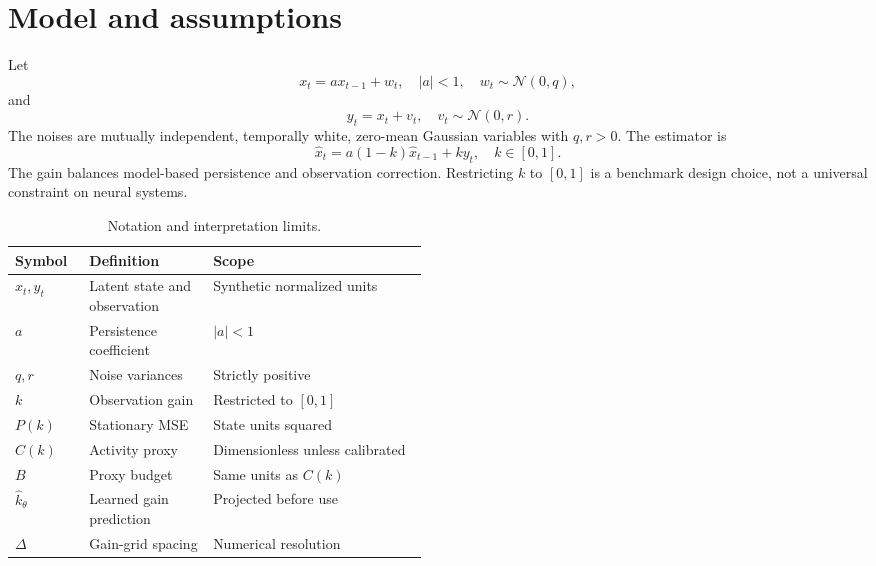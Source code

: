 \documentclass[10pt,a4paper]{article}
\begin{document}
\section{Model and assumptions}
Let
\begin{equation}
x_t=ax_{t-1}+w_t,\quad |a|<1,\quad w_t\sim\mathcal{N}(0,q),
\label{eq:state}
\end{equation}
and
\begin{equation}
y_t=x_t+v_t,\quad v_t\sim\mathcal{N}(0,r).
\label{eq:obs}
\end{equation}
The noises are mutually independent, temporally white, zero-mean Gaussian variables with $q,r>0$. The estimator is
\begin{equation}
\widehat{x}_t=a(1-k)\widehat{x}_{t-1}+ky_t,\quad k\in[0,1].
\label{eq:est}
\end{equation}
The gain balances model-based persistence and observation correction. Restricting $k$ to $[0,1]$ is a benchmark design choice, not a universal constraint on neural systems.

\begin{table}[htbp]\centering
\caption{Notation and interpretation limits.}\label{tab:notation}\small
\begin{tabularx}{\linewidth}{@{}p{0.18\linewidth}p{0.30\linewidth}X@{}}
\toprule
Symbol & Definition & Scope\\\midrule
$x_t,y_t$ & Latent state and observation & Synthetic normalized units\\
$a$ & Persistence coefficient & $|a|<1$\\
$q,r$ & Noise variances & Strictly positive\\
$k$ & Observation gain & Restricted to $[0,1]$\\
$P(k)$ & Stationary MSE & State units squared\\
$C(k)$ & Activity proxy & Dimensionless unless calibrated\\
$B$ & Proxy budget & Same units as $C(k)$\\
$\widehat{k}_\theta$ & Learned gain prediction & Projected before use\\
$\Delta$ & Gain-grid spacing & Numerical resolution\\
\bottomrule
\end{tabularx}\end{table}
\end{document}
